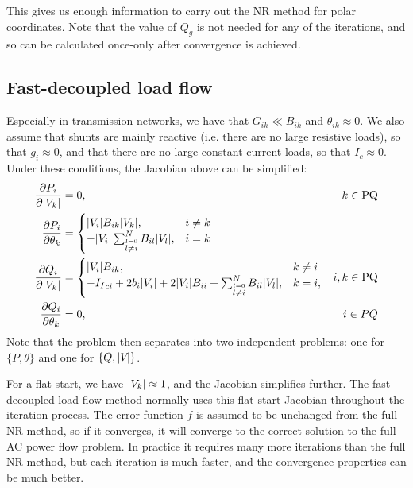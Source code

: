 \documentclass[10pt]{article}
\newcommand{\Ii}{{I_I}}
\begin{document}
This gives us enough information to carry out the NR method for polar coordinates. Note that the value of $Q_g$ is not needed for any of the iterations, and so can be calculated once-only after convergence is achieved.

\subsection{Fast-decoupled load flow}
Especially in transmission networks, we have that $G_{ik} \ll B_{ik}$ and $\theta_{ik} \approx 0$. We also assume that shunts are mainly reactive (i.e. there are no large resistive loads), so that $g_i \approx 0$, and that there are no large constant current loads, so that $I_c \approx 0$. Under these conditions, the Jacobian above can be simplified:
\begin{align}
	\frac{\partial P_i}{\partial \M{k}} &= 0, & k \in \text{PQ} \notag \\
	\frac{\partial P_i}{\partial \theta_k} &= 
		\begin{cases}
			\M{i}B_{ik}\M{k}, & i \ne k \\
			-\M{i}\sum_{\stackrel{l = 0}{l \ne i}}^NB_{il}\M{l}, &i = k
		\end{cases} \notag \\
	\frac{\partial Q_i}{\partial \M{k}} &= 
		\begin{cases}
			\M{i}B_{ik}, & k \ne i \\
			-\Ii_{ci} + 2b_i\M{i} + 2 \M{i}B_{ii} + \sum_{\stackrel{l = 0}{l \ne i}}^N{B_{il}\M{l}}, & k = i,
		\end{cases} & i, k \in \text{PQ} \notag \\
	\frac{\partial Q_i}{\partial \theta_k} &= 0, & i \in PQ
\end{align}
Note that the problem then separates into two independent problems: one for $\{P, \theta\}$ and one for $\{Q, |V_{}|\}$. 

For a flat-start, we have $|V_{k}| \approx 1$, and the Jacobian simplifies further. The fast decoupled load flow method normally uses this flat start Jacobian throughout the iteration process. The error function $f$ is assumed to be unchanged from the full NR method, so if it converges, it will converge to the correct solution to the full AC power flow problem. In practice it requires many more iterations than the full NR method, but each iteration is much faster, and the convergence properties can be much better.
\end{document}
